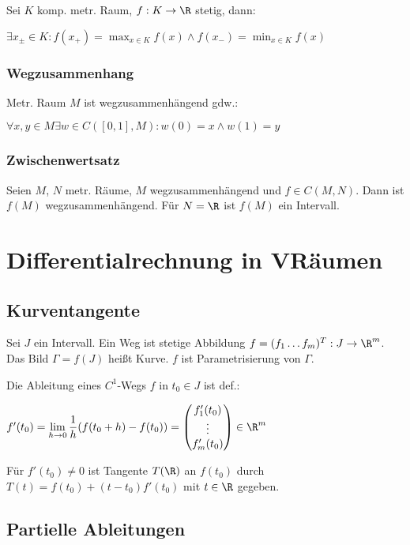 Sei $K$ komp. metr. Raum, $f: K \rightarrow \R$ stetig, dann:

$\exists x_{\pm} \in K : f(x_+) = \displaystyle\max_{x \in K} f(x) \land f(x_-) = \displaystyle\min_{x \in K} f(x)$

\subsubsection*{Wegzusammenhang}

Metr. Raum $M$ ist wegzusammenhängend gdw.:

$\forall x, y \in M \exists w \in C([0,1], M) : w(0) = x \land w(1) = y$

\subsubsection*{Zwischenwertsatz}

Seien $M$, $N$ metr. Räume, $M$ wegzusammenhängend und $f \in C(M, N)$. Dann ist $f(M)$ wegzusammenhängend. Für $N = \R$ ist $f(M)$ ein Intervall.

\section*{Differentialrechnung in VRäumen}

\subsection*{Kurventangente}

Sei $J$ ein Intervall. Ein Weg ist stetige Abbildung $f = (f_1 \hdots f_m)^T : J \rightarrow \R^m$. Das Bild $\Gamma = f(J)$ heißt Kurve. $f$ ist Parametrisierung von $\Gamma$.

Die Ableitung eines $C^1$-Wegs $f$ in $t_0 \in J$ ist def.:

$f'(t_0) = \displaystyle\lim_{h \to 0} \frac{1}{h} (f(t_0 + h) - f(t_0)) = \begin{pmatrix} f_1'(t_0) \\ \vdots \\ f_m'(t_0)\end{pmatrix} \in \R^m$

Für $f'(t_0) \neq 0$ ist Tangente $T(\R)$ an $f(t_0)$ durch $T(t) = f(t_0) + (t - t_0)f'(t_0)$ mit $t \in \R$ gegeben.

\subsection*{Partielle Ableitungen}


